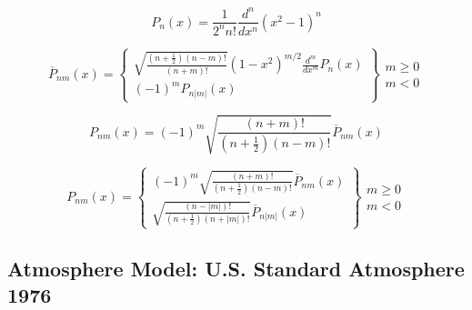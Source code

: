 \documentclass{article}
\begin{document}
\begin{equation}
P_n{\left(x\right)} = \frac{1}{2^n n!} \frac{d^n}{d x^n} \left(x^2 - 1\right)^n
\end{equation}

\begin{equation}
\overline{P}_{n m}{\left(x\right)} = \left\{\begin{array}{l}
\sqrt{\frac{\left(n + \frac{1}{2}\right) \left(n - m\right)!}{\left(n + m\right)!}} \left(1 - x^2\right)^{m / 2} \frac{d^m}{d x^m} P_n{\left(x\right)} \\
\left(-1\right)^m P_{n |m|}{\left(x\right)}
\end{array}\right\} \begin{array}{l}
m \geq 0 \\
m < 0
\end{array}
\end{equation}

\begin{equation}
P_{n m}{\left(x\right)} = \left(-1\right)^m \sqrt{\frac{\left(n + m\right)!}{\left(n + \frac{1}{2}\right) \left(n - m\right)!}} \overline{P}_{n m}{\left(x\right)}
\end{equation}

\begin{equation}
P_{n m}{\left(x\right)} = \left\{\begin{array}{l}
\left(-1\right)^m \sqrt{\frac{\left(n + m\right)!}{\left(n + \frac{1}{2}\right) \left(n - m\right)!}} \overline{P}_{n m}{\left(x\right)} \\
\sqrt{\frac{\left(n - |m|\right)!}{\left(n + \frac{1}{2}\right) \left(n + |m|\right)!}} \overline{P}_{n |m|}{\left(x\right)}
\end{array}\right\} \begin{array}{l}
m \geq 0 \\
m < 0
\end{array}
\end{equation}

\subsection{Atmosphere Model: U.S. Standard Atmosphere 1976~\cite{noaa76}}
\end{document}
